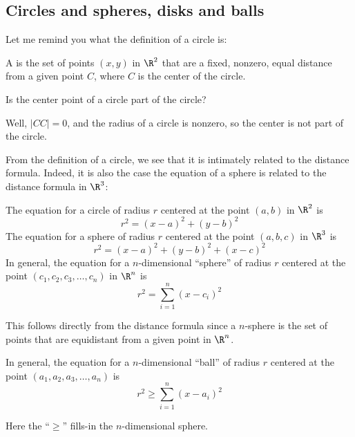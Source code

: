 \documentclass{ximera}
\begin{document}
\subsection{Circles and spheres, disks and balls}

Let me remind you what the definition of a circle is:
\begin{definition}
  A  is the set of points $(x,y)$ in $\R^2$ that are a
  fixed, nonzero, equal distance from a given point $C$, where $C$ is
  the center of the circle.
\end{definition}

\begin{question}
  Is the center point of a circle part of the circle?
  \begin{prompt}
    \begin{multipleChoice}
    \end{multipleChoice}
    \begin{feedback}
      Well, $|CC|=0$, and the radius of a circle is nonzero, so the
      center is not part of the circle.
    \end{feedback}
  \end{prompt}
\end{question}

From the definition of a circle, we see that it is intimately related
to the distance formula. Indeed, it is also the case the equation of a
sphere is related to the distance formula in $\R^3$:

\begin{theorem}
  The equation for a circle of radius $r$ centered at the point
  $(a,b)$ in $\R^2$ is
  \[
  r^2=(x-a)^2 + (y-b)^2
  \]
  The equation for a sphere of radius $r$ centered at the point
  $(a,b,c)$ in $\R^3$ is
  \[
  r^2 = (x-a)^2 + (y-b)^2 + (x-c)^2
  \]
  In general, the equation for a $n$-dimensional ``sphere'' of radius
  $r$ centered at the point $(c_1,c_2,c_3,\dots,c_n)$ in $\R^n$ is
  \[
  r^2 = \sum_{i=1}^n(x-c_i)^2
  \]
  \begin{explanation}
    This follows directly from the distance formula since a $n$-sphere
    is the set of points that are equidistant from a given point in
    $\R^n$.
  \end{explanation}
\end{theorem}

\begin{corollary}
  In general, the equation for a $n$-dimensional ``ball'' of radius
  $r$ centered at the point $(a_1,a_2,a_3,\dots,a_n)$ is
  \[
  r^2 \ge \sum_{i=1}^n(x-a_i)^2
  \]
  \begin{explanation}
    Here the ``$\ge$'' fills-in the $n$-dimensional sphere.
  \end{explanation}
\end{corollary}
\end{document}
